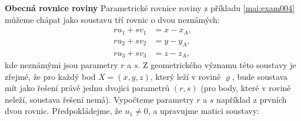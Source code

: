 \wikitextrule
\begin{example}\label{mai:exam040}
  \textbf{Obecná rovnice roviny}\newline\small
  Parametrické rovnice roviny z příkladu \ref{mai:exam004} můžeme chápat jako soustavu tří rovnic o 
  dvou neznámých:
  \begin{align*}
      ru_1 + sv_1 &= x - x_A, \\
      ru_2 + sv_2 &= y - y_A, \\
      ru_3 + sv_3 &= z - z_A, 
  \end{align*}
  kde neznámými jsou parametry \(r\) a \(s\). Z geometrického významu této soustavy je zřejmé, že 
  pro každý bod \(X = (x, y, z)\), který leží v rovině \(\varrho\), bude soustava mít jako řešení 
  právě jednu dvojici parametrů \((r, s)\) (pro body, které v rovině neleží, soustava řešení nemá). 
  Vypočteme parametry \(r\) a \(s\) například z prvních dvou rovnic. Předpokládejme, že \(u_1 \neq 
  0\), a upravujme matici soustavy:
  

\end{example}
